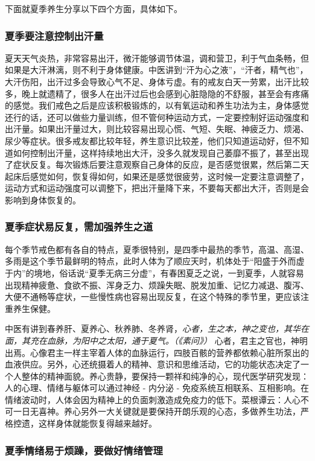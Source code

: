 下面就夏季养生分享以下四个方面，具体如下。

\subsubsection{夏季要注意控制出汗量}

夏天天气炎热，非常容易出汗，微汗能够调节体温，调和营卫，利于气血条畅，但如果是大汗淋漓，则不利于身体健康。中医讲到“汗为心之液”，“汗者，精气也”，大汗伤阳，出汗过多会导致心气不足、身体亏虚。有的戒友白天一劳累，出汗比较多，晚上就遗精了，很多人在出汗过后也会感到心脏隐隐的不舒服，甚至会有疼痛的感觉。我们戒色之后是应该积极锻炼的，以有氧运动和养生功法为主，身体感觉还行的话，还可以做些力量训练，但不管何种运动方式，一定要控制好运动强度和出汗量。如果出汗量过大，则比较容易出现心慌、气短、失眠、神疲乏力、烦渴、尿少等症状。很多戒友都比较年轻，养生意识比较差，他们只知道运动好，但不知道如何控制出汗量，这样持续地出大汗，没多久就发现自己萎靡不振了，甚至出现了症状反复。每次锻炼后要注意观察自己身体的反应，是否感觉很累，然后第二天起床后感觉如何，恢复得如何，如果还是感觉很疲劳，这时候一定要注意调整了，运动方式和运动强度可以调整下，把出汗量降下来，不要每天都出大汗，否则是会影响到身体恢复的。

\subsubsection{夏季症状易反复，需加强养生之道}

每个季节戒色都有各自的特点，夏季很特别，是四季中最热的季节，高温、高湿、多雨是这个季节最鲜明的特点，此时人体为了顺应天时，机体处于“阳盛于外而虚于内”的境地，俗话说“夏季无病三分虚”，有春困夏乏之说，一到夏季，人就容易出现精神疲惫、食欲不振、浑身乏力、烦躁失眠、脱发加重、记忆力减退、腹泻、大便不通畅等症状，一些慢性病也容易出现反复，在这个特殊的季节里，更应该注重养生保健。

中医有讲到春养肝、夏养心、秋养肺、冬养肾，\textit{心者，生之本，神之变也，其华在面，其充在血脉，为阳中之太阳，通于夏气。（《素问》）} 心者，君主之官也，神明出焉。心像君主一样主宰着人体的血脉运行，四肢百骸的营养都依赖心脏所泵出的血液供应。另外，心还统摄着人的精神、意识和思维活动，它的功能状态决定了一个人整体的精神面貌。养心贵静，要保持一颗祥和纯净的心，现代医学研究发现：人的心理、情绪与躯体可以通过神经 - 内分泌 - 免疫系统互相联系、互相影响。在情绪波动时，人体会因为精神上的负面刺激造成免疫力的低下。菜根谭云：人心不可一日无喜神。养心另外一大关键就是要保持开朗乐观的心态，多做养生功法，严格控遗，这样身体就能恢复得越来越好。

\subsubsection{夏季情绪易于烦躁，要做好情绪管理}

